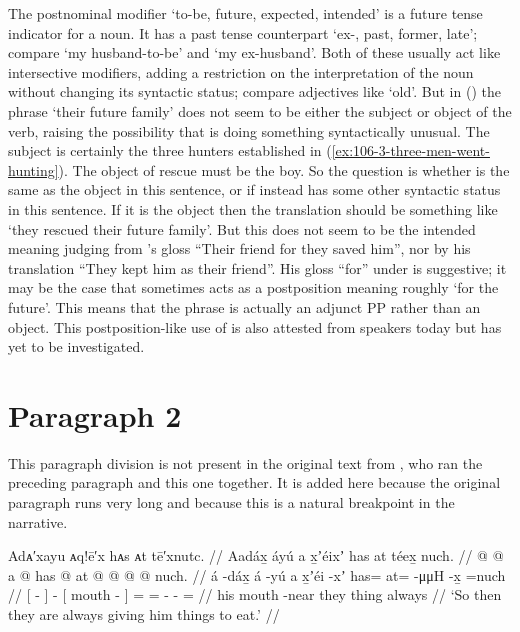 The postnominal modifier  ‘to-be, future, expected, intended’ is a future tense indicator for a noun.
It has a past tense counterpart  ‘ex-, past, former, late’; compare  ‘my husband-to-be’ and  ‘my ex-husband’.
Both of these usually act like intersective modifiers, adding a restriction on the interpretation of the noun without changing its syntactic status; compare adjectives like  ‘old’.
But in (\lastx) the phrase  ‘their future family’ does not seem to be either the subject or object of the verb, raising the possibility that  is doing something syntactically unusual.
The subject is certainly the three hunters established in (\ref{ex:106-3-three-men-went-hunting}).
The object of rescue must be the boy.
So the question is whether  is the same as the object in this sentence, or if instead  has some other syntactic status in this sentence.
If it is the object then the translation should be something like ‘they rescued their future family’.
But this does not seem to be the intended meaning judging from \citeauthor{swanton:1909}’s gloss “Their friend for they saved him”, nor by his translation “They kept him as their friend”.
His gloss “for” under  is suggestive; it may be the case that  sometimes acts as a postposition meaning roughly ‘for the future’.
This means that the phrase  is actually an adjunct PP rather than an object.
This postposition-like use of  is also attested from speakers today but has yet to be investigated.

\section{Paragraph 2}\label{sec:106-para-2}

This paragraph division is not present in the original text from \citeauthor{swanton:1909}, who ran the preceding paragraph and this one together.
It is added here because the original paragraph runs very long and because this is a natural breakpoint in the narrative.

\ex\label{ex:106-13-give-him-to-eat}%
%
\begingl
	\glpreamble	Adᴀ′xayu ᴀq!ē′x hᴀs ᴀt tē′xnutc. //
	\glpreamble	Aadáx̱ áyú a x̱ʼéixʼ has at téex̱ nuch. //
	\gla	{}  @ {} {}  @ {}
			{} a  @ {} {}
			has @ at @  @ {} @ {} @ \•nuch. //
	\glb	{} á -dáx̱ {} á -yú
			{} a x̱ʼéi -xʼ {}
			has= at=  -μμH -x̱ =nuch //
	\glc	{}[  - {}]  -
			{}[  mouth - {}]
			= =  - - = //
	\gld	{}  {} {}
			 {}
			{} his mouth -near {}
			they thing  {} {} \•always //
	\glft	‘So then they are always giving him things to eat.’
		//
\endgl
\xe

